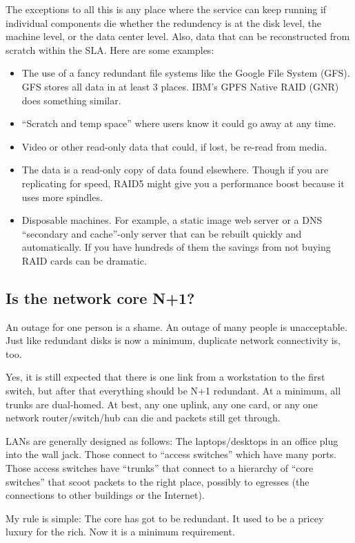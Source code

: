 \documentclass{article}
\begin{document}
The exceptions to all this is any place where the service can keep running if individual components die whether the redundency is at the disk level, the machine level, or the data center level. Also, data that can be reconstructed from scratch within the SLA. Here are some examples:

\begin{itemize}
    \item The use of a fancy redundant file systems like the Google File System (GFS). GFS stores all data in at least 3 places. IBM's GPFS Native RAID (GNR) does something similar.
    \item ``Scratch and temp space'' where users know it could go away at any time.
    \item Video or other read-only data that could, if lost, be re-read from media.
    \item The data is a read-only copy of data found elsewhere. Though if you are replicating for speed, RAID5 might give you a performance boost because it uses more spindles.
    \item Disposable machines. For example, a static image web server or a DNS ``secondary and cache''-only server that can be rebuilt quickly and automatically. If you have hundreds of them the savings from not buying RAID cards can be dramatic.
\end{itemize}

\subsection{Is the network core N+1?}
An outage for one person is a shame. An outage of many people is unacceptable. Just like redundant disks is now a minimum, duplicate network connectivity is, too.

Yes, it is still expected that there is one link from a workstation to the first switch, but after that everything should be N+1 redundant. At a minimum, all trunks are dual-homed. At best, any one uplink, any one card, or any one network router/switch/hub can die and packets still get through.

LANs are generally designed as follows: The laptops/desktops in an office plug into the wall jack. Those connect to ``access switches'' which have many ports. Those access switches have ``trunks'' that connect to a hierarchy of ``core switches'' that scoot packets to the right place, possibly to egresses (the connections to other buildings or the Internet).

My rule is simple: The core has got to be redundant. It used to be a pricey luxury for the rich. Now it is a minimum requirement.
\end{document}
